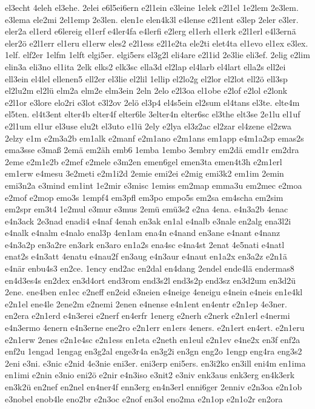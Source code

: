 {el3echt
4eleh
el3ehe.
2elei
e6l5ei6ern
e2l1ein
e3leine
1elek
e2l1el
1e2lem
2e3lem.
e3lema
ele2mi
2el1emp
2e3len.
elen1e
elen4k3l
e4lense
e2l1ent
e3lep
2eler
e3ler.
eler2a
el1erd
e6lereig
el1erf
e4ler4fa
e4lerfi
e2lerg
el1erh
el1erk
e2l1erl
e4l3ernä
eler2ö
e2l1err
el1eru
el1erw
eles2
e2l1ess
e2l1e2ta
ele2ti
elet4ta
el1evo
el1ex
e3lex.
1elf.
elf2er
1elfm
1elft
elgi5er.
elgi5ers
el3g2l
eli4are
e2l1id
2e3lie
eli3ef.
2elig
e2lim
elin3a
eli3no
el1ita
2elk
elks2
elk3sc
ella3d
el2lap
el4larb
el4lart
ella2s
ell2ei
ell3ein
el4lel
ellenen5
ell2er
el3lie
el2lil
1ellip
el2lo2g
el2lor
el2lot
ell2ö
ell3sp
el2lu2m
el2lü
elm2a
elm2e
elm3ein
2eln
2elo
e2l3oa
el1obe
e2lof
e2lol
e2lonk
e2l1or
e3lore
elo2ri
e3lot
e3l2ov
2elö
el3p4
el4s5ein
el2sum
el4tans
el3te.
elte4m
el5ten.
el4t3ent
elter4b
elter4f
elter6le
3elter4n
elter6sc
el3the
elt3se
2e1lu
el1uf
e2l1um
el1ur
el3use
elu2t
el3uto
e1lü
2ely
e2lya
el3z2ac
el2zar
el4zene
el2zwa
2elzy
e1m
e2m3a2b
em1alk
e2manf
e2m1ano
e2m1ans
em1app
e4m1a2sp
emas2s
ema3sse
e3maß
2emä
em2äh
emb6
1emba
1embo
3embry
em2dä
emd1r
em2dra
2eme
e2m1e2b
e2mef
e2mele
e3m2en
emen6gel
emen3ta
emen4t3h
e2m1erl
em1erw
e4mesu
3e2meti
e2m1i2d
2emie
emi2ei
e2mig
emi3k2
em1im
2emin
emi3n2a
e3mind
em1int
1e2mir
e3misc
1emiss
em2map
emma3u
em2mec
e2moa
e2mof
e2mop
emo3s
1empf4
em3pfl
em3po
empo5s
em2sa
em4scha
em2sim
em2spr
em3t4
1e2mul
e3mur
e3mus
2emü
emü3s2
e2na
4ena.
e4n3a2b
4enac
e4n3ack
2e3nad
enadi4
e4naf
4enah
en3ak
en1al
e4nalb
e3nale
en2alg
ena3l2i
e4nalk
e4nalm
e4nalo
enal3p
4en1am
ena4n
e4nand
en3ane
e4nant
e4nanz
e4n3a2p
en3a2re
en3ark
en3aro
en1a2s
ena4sc
e4na4st
2enat
4e5nati
e4natl
enat2s
e4n3att
4enatu
e4nau2f
en3aug
e4n3aur
e4naut
en1a2x
en3a2z
e2n1ä
e4när
enbu4s3
en2ce.
1ency
end2ac
en2dal
en4dang
2endel
ende4lä
endermas8
en4d3es4s
en2dex
en3d4ort
end3rom
end3s2l
end3s2p
end3sz
en3d2um
en3d2ü
2ene.
ene4ben
en1ec
e2neff
en2eid
e3neien
e4neige
4eneigu
e4nein
e4neis
en1e4kl
e2n1el
ene4le
2ene2m
e2nemi
2enen
e4nense
e4n1ent
en4entr
e2n1ep
4e3ner.
en2era
e2n1erd
e4n3erei
e2nerf
en4erfr
1energ
e2nerh
e2nerk
e2n1erl
e4nermi
e4n3ermo
4enern
e4n3erne
ene2ro
e2n1err
en1ers
4eners.
e2n1ert
en4ert.
e2n1eru
e2n1erw
2enes
e2n1e4sc
e2n1ess
en1eta
e2neth
en1eul
e2n1ev
e4ne2x
en3f
enf2a
enf2u
1engad
1engag
en3g2al
enge3r4a
en3g2i
en3gn
eng2o
1engp
eng4ra
eng3s2
2eni
e3ni.
e3nic
e2nid
4e3nie
eni3er.
eni3erp
eni5ers.
en3i2ko
en3ill
eni4m
en1ima
en1imi
e2nin
e3nio
eni2ö
e2nir
e4n3iso
e3nit2
e3niv
enk3aus
enk3erg
en4k3erk
en3k2ü
en2nef
en2nel
en4ner4f
enn3erg
en4n3erl
enni6ger
2enniv
e2n3oa
e2n1ob
e3nobel
enob4le
eno2br
e2n3oc
e2nof
en3ol
eno2ma
e2n1op
e2n1o2r
en2ora
}
